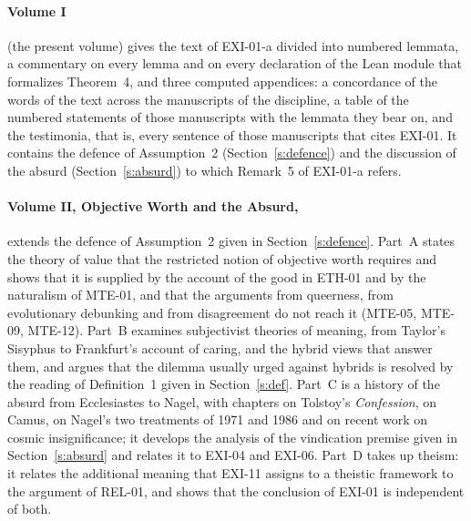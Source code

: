 \paragraph{Volume I} (the present volume) gives the text of EXI-01-a divided into numbered lemmata, a commentary on every lemma and on every declaration of the Lean module that formalizes Theorem~4, and three computed appendices: a concordance of the words of the text across the manuscripts of the discipline, a table of the numbered statements of those manuscripts with the lemmata they bear on, and the testimonia, that is, every sentence of those manuscripts that cites EXI-01. It contains the defence of Assumption~2 (Section~\ref{s:defence}) and the discussion of the absurd (Section~\ref{s:absurd}) to which Remark~5 of EXI-01-a refers.

\paragraph{Volume II, Objective Worth and the Absurd,} extends the defence of Assumption~2 given in Section~\ref{s:defence}. Part~A states the theory of value that the restricted notion of objective worth requires and shows that it is supplied by the account of the good in ETH-01 and by the naturalism of MTE-01, and that the arguments from queerness, from evolutionary debunking and from disagreement do not reach it (MTE-05, MTE-09, MTE-12). Part~B examines subjectivist theories of meaning, from Taylor's Sisyphus to Frankfurt's account of caring, and the hybrid views that answer them, and argues that the dilemma usually urged against hybrids is resolved by the reading of Definition~1 given in Section~\ref{s:def}. Part~C is a history of the absurd from Ecclesiastes to Nagel, with chapters on Tolstoy's \emph{Confession}, on Camus, on Nagel's two treatments of 1971 and 1986 and on recent work on cosmic insignificance; it develops the analysis of the vindication premise given in Section~\ref{s:absurd} and relates it to EXI-04 and EXI-06. Part~D takes up theism: it relates the additional meaning that EXI-11 assigns to a theistic framework to the argument of REL-01, and shows that the conclusion of EXI-01 is independent of both.

